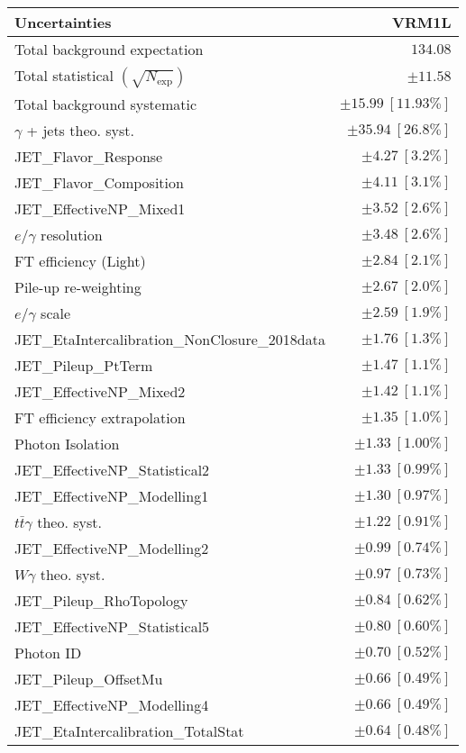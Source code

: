 \begin{tabular}{lr}
\hline
\textbf{Uncertainties} & \textbf{VRM1L} \\
\hline
Total background expectation & $134.08$ \\
\hline
Total statistical $(\sqrt{N_\mathrm{exp}})$ & $\pm 11.58$ \\
Total background systematic & $\pm 15.99\ [11.93\%]$ \\
\hline
\hline
$\gamma$ + jets theo. syst. & $\pm 35.94\ [26.8\%]$ \\
JET\_Flavor\_Response & $\pm 4.27\ [3.2\%]$ \\
JET\_Flavor\_Composition & $\pm 4.11\ [3.1\%]$ \\
JET\_EffectiveNP\_Mixed1 & $\pm 3.52\ [2.6\%]$ \\
$e/\gamma$ resolution & $\pm 3.48\ [2.6\%]$ \\
FT efficiency (Light) & $\pm 2.84\ [2.1\%]$ \\
Pile-up re-weighting & $\pm 2.67\ [2.0\%]$ \\
$e/\gamma$ scale & $\pm 2.59\ [1.9\%]$ \\
JET\_EtaIntercalibration\_NonClosure\_2018data & $\pm 1.76\ [1.3\%]$ \\
JET\_Pileup\_PtTerm & $\pm 1.47\ [1.1\%]$ \\
JET\_EffectiveNP\_Mixed2 & $\pm 1.42\ [1.1\%]$ \\
FT efficiency extrapolation & $\pm 1.35\ [1.0\%]$ \\
Photon Isolation & $\pm 1.33\ [1.00\%]$ \\
JET\_EffectiveNP\_Statistical2 & $\pm 1.33\ [0.99\%]$ \\
JET\_EffectiveNP\_Modelling1 & $\pm 1.30\ [0.97\%]$ \\
$t\bar{t}\gamma$ theo. syst. & $\pm 1.22\ [0.91\%]$ \\
JET\_EffectiveNP\_Modelling2 & $\pm 0.99\ [0.74\%]$ \\
$W\gamma$ theo. syst. & $\pm 0.97\ [0.73\%]$ \\
JET\_Pileup\_RhoTopology & $\pm 0.84\ [0.62\%]$ \\
JET\_EffectiveNP\_Statistical5 & $\pm 0.80\ [0.60\%]$ \\
Photon ID & $\pm 0.70\ [0.52\%]$ \\
JET\_Pileup\_OffsetMu & $\pm 0.66\ [0.49\%]$ \\
JET\_EffectiveNP\_Modelling4 & $\pm 0.66\ [0.49\%]$ \\
JET\_EtaIntercalibration\_TotalStat & $\pm 0.64\ [0.48\%]$ \\

\end{tabular}
